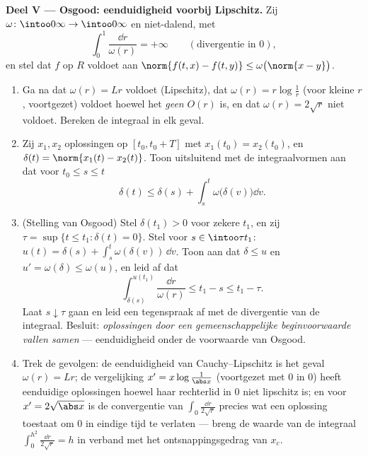 \begin{problem}[{Weekendopgave --- bestaan van oplossingen van $x'
= f(t, x)$ zonder Lipschitz}]
\medskip
\noindent\textbf{Deel V --- Osgood: eenduidigheid voorbij
Lipschitz.} Zij $\omega\colon\intoo0\infty\to\intoo0\infty$
 en niet-dalend, met
\[
\int_0^1\frac{\dd r}{\omega(r)} = +\infty
\qquad(\text{divergentie in } 0),
\]
en stel dat $f$ op $R$ voldoet aan $\norm{f(t, x) - f(t, y)} \leq
\omega\bigl(\norm{x - y}\bigr)$.
\begin{enumerate}[resume]
  \item Ga na dat $\omega(r) = Lr$ voldoet (Lipschitz), dat
        $\omega(r) = r\log\frac1r$ (voor kleine $r$, 
        voortgezet) voldoet hoewel het \emph{geen} $O(r)$ is, en
        dat $\omega(r) = 2\sqrt r$ niet voldoet. Bereken de
        integraal in elk geval.
  \item Zij $x_1, x_2$ oplossingen op $[t_0, t_0 + T]$ met
        $x_1(t_0) = x_2(t_0)$, en $\delta(t) = \norm{x_1(t) -
        x_2(t)}$. Toon uitsluitend met de integraalvormen aan dat
        voor $t_0 \leq s \leq t$
        \[
        \delta(t) \leq \delta(s) +
        \int_s^t\omega\bigl(\delta(v)\bigr)\dd v .
        \]
  \item (Stelling van Osgood) Stel $\delta(t_1) > 0$ voor zekere
        $t_1$, en zij $\tau = \sup\{t \leq t_1 : \delta(t) = 0\}$.
        Stel voor $s \in \intoo\tau{t_1}$: $u(t) = \delta(s) +
        \int_s^t\omega(\delta(v))\,\dd v$. Toon aan dat $\delta
        \leq u$ en $u' = \omega(\delta) \leq \omega(u)$, en leid
        af dat
        \[
        \int_{\delta(s)}^{u(t_1)}\frac{\dd r}{\omega(r)}
        \leq t_1 - s \leq t_1 - \tau .
        \]
        Laat $s \downarrow \tau$ gaan en leid een tegenspraak af
        met de divergentie van de integraal. Besluit:
        \emph{oplossingen door een gemeenschappelijke
        beginvoorwaarde vallen samen} --- eenduidigheid onder de
        voorwaarde van Osgood.
  \item Trek de gevolgen: de eenduidigheid van Cauchy--Lipschitz
        is het geval $\omega(r) = Lr$; de vergelijking $x' =
        x\log\frac1{\abs x}$ (voortgezet met $0$ in $0$) heeft
        eenduidige oplossingen hoewel haar rechterlid in $0$ niet
        lipschitz is; en voor $x' = 2\sqrt{\abs x}$ is de
        convergentie van $\int_0\frac{\dd r}{2\sqrt r}$ precies
        wat een oplossing toestaat om $0$ in eindige tijd te
        verlaten --- breng de waarde van de integraal
        $\int_0^{h^2}\frac{\dd r}{2\sqrt r} = h$ in verband met
        het ontsnappingsgedrag van $x_c$.
\end{enumerate}


\end{problem}

